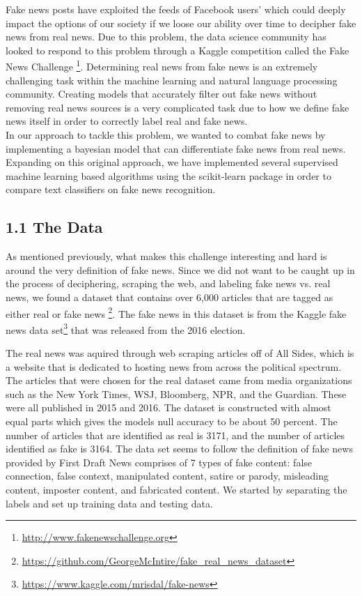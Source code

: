 \documentclass{neu_handout}
\begin{document}
Fake news posts have exploited the feeds of Facebook users' which could deeply impact the options of our society if we loose our ability over time to decipher fake news from real news. Due to this problem, the data science community has looked to respond to this problem through a Kaggle competition called the Fake News Challenge \footnote{\url{http://www.fakenewschallenge.org}}. Determining real news from fake news is an extremely challenging task within the machine learning and natural language processing community. Creating models that accurately filter out fake news without removing real news sources is a very complicated task due to how we define fake news itself in order to correctly label real and fake news.\\

In our approach to tackle this problem, we wanted to combat fake news by implementing a bayesian model that can differentiate fake news from real news. Expanding on this original approach, we have implemented several supervised machine learning based algorithms using the scikit-learn package in order to compare text classifiers on fake news recognition. 


\subsection*{1.1 The Data}
As mentioned previously, what makes this challenge interesting and hard is around the very definition of fake news. Since we did not want to be caught up in the process of deciphering, scraping the web, and labeling fake news vs. real news, we found a dataset that contains over 6,000 articles that are tagged as either real or fake news \footnote{\url{https://github.com/GeorgeMcIntire/fake_real_news_dataset}}. The fake news in this dataset is from the Kaggle fake news data set\footnote{\url{https://www.kaggle.com/mrisdal/fake-news}} that was released from the 2016 election.

The real news was aquired through web scraping articles off of All Sides, which is a website that is dedicated to hosting news from across the political spectrum. The articles that were chosen for the real dataset came from media organizations such as the New York Times, WSJ, Bloomberg, NPR, and the Guardian. These were all published in 2015 and 2016. The dataset is constructed with almost equal parts which gives the models null accuracy to be about 50 percent. The number of articles that are identified as real is 3171, and the number of articles identified as fake is 3164. The data set seems to follow the definition of fake news provided by First Draft News comprises of 7 types of fake content: false connection, false context, manipulated content, satire or parody, misleading content, imposter content, and fabricated content. We started by separating the labels and set up training data and testing data.
\end{document}
